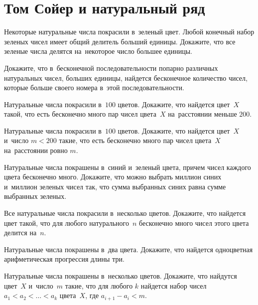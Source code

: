 
\section*{Том Сойер и натуральный ряд}


\begin{problems}

\item
Некоторые натуральные числа покрасили в~зеленый цвет.
Любой конечный набор зеленых чисел имеет общий делитель больший единицы.
Докажите, что все зеленые числа делятся на~некоторое число большее единицы.

\item
Докажите, что в~бесконечной последовательности попарно различных натуральных
чисел, больших единицы, найдется бесконечное количество чисел, которые больше
своего номера в~этой последовательности.

\item
Натуральные числа покрасили в~$100$ цветов.
Докажите, что найдется цвет~$X$ такой, что есть бесконечно много пар чисел
цвета~$X$ на~расстоянии меньше $200$.

\item
Натуральные числа покрасили в~$100$ цветов.
Докажите, что найдется цвет~$X$ и~число $m < 200$ такие, что есть бесконечно
много пар чисел цвета~$X$ на~расстоянии ровно $m$.

\item
Натуральные числа покрашены в~синий и~зеленый цвета, причем чисел каждого цвета
бесконечно много.
Докажите, что можно выбрать миллион синих и~миллион зеленых чисел так, что
сумма выбранных синих равна сумме выбранных зеленых.

\item
Все натуральные числа покрасили в~несколько цветов.
Докажите, что найдется цвет такой, что для любого натурального~$n$ бесконечно
много чисел этого цвета делится на~$n$.

\item
Натуральные числа покрашены в~два цвета.
Докажите, что найдется одноцветная арифметическая прогрессия длины три.

\item
Натуральные числа покрашены в~несколько цветов.
Докажите, что найдутся цвет~$X$ и~число~$m$ такие, что для любого $k$ найдется
набор чисел $a_1 < a_2 < \ldots < a_k$ цвета~$X$, где $a_{i + 1} - a_i < m$.

\end{problems}

